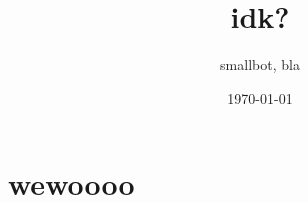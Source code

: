 \documentclass[11pt]{book}
\title{idk?}
\author{smallbot, bla}
\date{\today}
\begin{document}
    \maketitle
    \frontmatter
    \tableofcontents
    \mainmatter
    \chapter[wee]{wewoooo}\label{ch:wewoooo}
\end{document}
